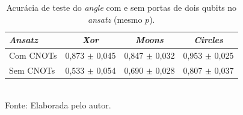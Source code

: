 \begin{table}[htb]
\centering
\caption[Ablação do entrelaçamento no \textit{angle}]{Acurácia de teste do \textit{angle} com e sem portas de dois qubits no \textit{ansatz} (mesmo $p$).}
\label{tab:ablacao}
\begin{tabular}{lccc}
\toprule
\textit{Ansatz} & \textit{Xor} & \textit{Moons} & \textit{Circles} \\
\midrule
Com CNOTs & 0,873 $\pm$ 0,045 & 0,847 $\pm$ 0,032 & 0,953 $\pm$ 0,025 \\
Sem CNOTs & 0,533 $\pm$ 0,054 & 0,690 $\pm$ 0,028 & 0,807 $\pm$ 0,037 \\
\bottomrule
\end{tabular}
\\[2pt]
{\footnotesize Fonte: Elaborada pelo autor.}
\end{table}
